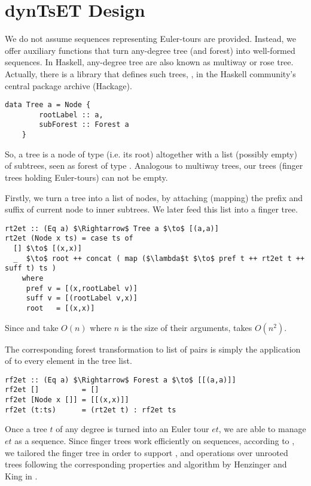 \section{dynTsET Design}
\label{sec:TechDes}  

We do not assume sequences representing Euler-tours are provided. Instead, we offer auxiliary functions that turn any-degree tree (and forest) into well-formed sequences. In Haskell, any-degree tree are also known as multiway or rose tree. Actually, there is a library that defines such trees, , in the Haskell community's central package archive (Hackage).

\begin{lstlisting}
data Tree a = Node {
        rootLabel :: a,         
        subForest :: Forest a   
    }
\end{lstlisting}

So, a tree is a node of type  (i.e. its root) altogether with a list (possibly empty) of subtrees, seen as forest of type . Analogous to multiway trees, our trees (finger trees holding Euler-tours) can not be empty. 

Firstly, we turn a tree into a list of nodes, by attaching (mapping) the prefix and suffix of current node to inner subtrees. We later feed this list into a finger tree. 

\begin{lstlisting}[mathescape] 
rt2et :: (Eq a) $\Rightarrow$ Tree a $\to$ [(a,a)] 
rt2et (Node x ts) = case ts of
  [] $\to$ [(x,x)]
  _  $\to$ root ++ concat ( map ($\lambda$t $\to$ pref t ++ rt2et t ++ suff t) ts )   
    where
     pref v = [(x,rootLabel v)]
     suff v = [(rootLabel v,x)]
     root   = [(x,x)] 
\end{lstlisting} 

Since  and \code{++} take $O(n)$ where $n$ is the size of their arguments,  takes $O(n^2)$. 

The corresponding forest transformation to list of pairs is simply the application of  to every element in the tree list. 

\begin{lstlisting}[mathescape] 
rf2et :: (Eq a) $\Rightarrow$ Forest a $\to$ [[(a,a)]]
rf2et []          = []
rf2et [Node x []] = [[(x,x)]]  
rf2et (t:ts)      = (rt2et t) : rf2et ts
\end{lstlisting}

Once a tree $t$ of any degree is turned into an Euler tour $et$, we are able to manage $et$ as a sequence. Since finger trees work efficiently on sequences, according to \cite{FTs}, we tailored the finger tree in order to support \link, \cut and \connected operations over unrooted trees following the corresponding properties and algorithm by Henzinger and King in \cite{Rand-DynGs-Algos}.

